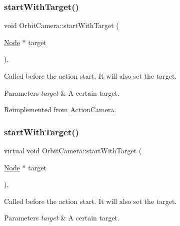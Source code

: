 \subsubsection{\texorpdfstring{start\+With\+Target()}{startWithTarget()}\hspace{0.1cm}{\footnotesize\ttfamily [1/2]}}
{\footnotesize\ttfamily void Orbit\+Camera\+::start\+With\+Target (\begin{DoxyParamCaption}\item[{\hyperlink{classNode}{Node} $\ast$}]{target }\end{DoxyParamCaption})\hspace{0.3cm}{\ttfamily [override]}, {\ttfamily [virtual]}}

Called before the action start. It will also set the target.


\begin{DoxyParams}{Parameters}
{\em target} & A certain target. \\
\hline
\end{DoxyParams}


Reimplemented from \hyperlink{classActionCamera_ab523607be45f90017decf4c5e493c733}{Action\+Camera}.

\mbox{\label{classOrbitCamera_acb7061358c67002d8e7459ec0911f79d}} 
\subsubsection{\texorpdfstring{start\+With\+Target()}{startWithTarget()}\hspace{0.1cm}{\footnotesize\ttfamily [2/2]}}
{\footnotesize\ttfamily virtual void Orbit\+Camera\+::start\+With\+Target (\begin{DoxyParamCaption}\item[{\hyperlink{classNode}{Node} $\ast$}]{target }\end{DoxyParamCaption})\hspace{0.3cm}{\ttfamily [override]}, {\ttfamily [virtual]}}

Called before the action start. It will also set the target.


\begin{DoxyParams}{Parameters}
{\em target} & A certain target. \\
\hline
\end{DoxyParams}



